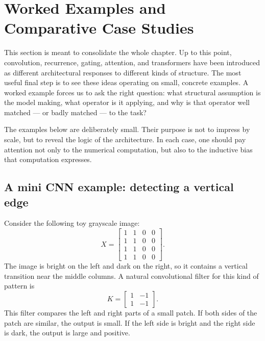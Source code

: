 \section{Worked Examples and Comparative Case Studies}

This section is meant to consolidate the whole chapter.
Up to this point, convolution, recurrence, gating, attention, and transformers have been introduced as different architectural responses to different kinds of structure.
The most useful final step is to see these ideas operating on small, concrete examples.
A worked example forces us to ask the right question: what structural assumption is the model making, what operator is it applying, and why is that operator well matched --- or badly matched --- to the task?

\medskip

The examples below are deliberately small.
Their purpose is not to impress by scale, but to reveal the logic of the architecture.
In each case, one should pay attention not only to the numerical computation, but also to the inductive bias that computation expresses.

\subsection*{A mini CNN example: detecting a vertical edge}

Consider the following toy grayscale image:
\[
X=
\begin{bmatrix}
1 & 1 & 0 & 0\\
1 & 1 & 0 & 0\\
1 & 1 & 0 & 0\\
1 & 1 & 0 & 0
\end{bmatrix}.
\]
The image is bright on the left and dark on the right, so it contains a vertical transition near the middle columns.
A natural convolutional filter for this kind of pattern is
\[
K=
\begin{bmatrix}
1 & -1\\
1 & -1
\end{bmatrix}.
\]
This filter compares the left and right parts of a small patch.
If both sides of the patch are similar, the output is small.
If the left side is bright and the right side is dark, the output is large and positive.

